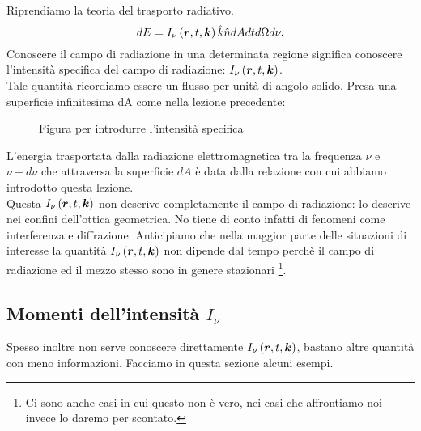 Riprendiamo la teoria del trasporto radiativo.
\[
	dE = I_{\nu}\left( \boldsymbol{r}, t,\boldsymbol{k} \right) \hat{k}\hat{n} dAdtd\Omega d\nu
.\] 
Conoscere il campo di radiazione in una determinata regione significa conoscere l'intensità specifica del campo di radiazione: $I_{\nu}\left( \boldsymbol{r}, t,\boldsymbol{k} \right)$.\\ 
Tale quantità ricordiamo essere un flusso per unità di angolo solido. Presa una superficie infinitesima dA come nella lezione precedente:
\begin{figure}[H]
    \centering
    \caption{Figura per introdurre l'intensità specifica}
    \label{fig:figura-per-introdurre-lintensit-specifica}
\end{figure}
\noindent
L'energia trasportata dalla radiazione elettromagnetica tra la frequenza $\nu$ e $\nu + d\nu$ che attraversa la superficie $dA$ è data dalla relazione con cui abbiamo introdotto questa lezione.\\
Questa $I_{\nu}\left( \boldsymbol{r}, t, \boldsymbol{k} \right)$ non descrive completamente il campo di radiazione: lo descrive nei confini dell'ottica geometrica. No tiene di conto infatti di fenomeni come interferenza e diffrazione. Anticipiamo che nella maggior parte delle situazioni di interesse la quantità $I_{\nu}\left( \boldsymbol{r}, t,\boldsymbol{k} \right)$ non dipende dal tempo perchè il campo di radiazione ed il mezzo stesso sono in genere stazionari \footnote{Ci sono anche casi in cui questo non è vero, nei casi che affrontiamo noi invece lo daremo per scontato.}. \\
\subsection{Momenti dell'intensità $I_{\nu}$}%
Spesso inoltre non serve conoscere direttamente  $I_{\nu}\left( \boldsymbol{r}, t,\boldsymbol{k} \right)$, bastano altre quantità con meno informazioni. Facciamo in questa sezione alcuni esempi.
